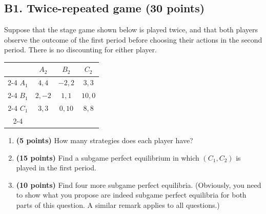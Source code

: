 \documentclass[11pt]{article}
\newcommand{\pts}[1]{\textbf{(#1 points)}}
\begin{document}
\subsection*{B1. Twice-repeated game \pts{30}}
Suppose that the stage game shown below is played twice, and that both players observe the outcome of the first period before choosing their actions in the second period. There is no discounting for either player.
\begin{center}
\begin{tabular}{c|c|c|c|}
  \multicolumn{1}{c}{} & \multicolumn{1}{c}{$A_2$} & \multicolumn{1}{c}{$B_2$} & \multicolumn{1}{c}{$C_2$} \\ \cline{2-4}
  $A_1$ & $4,4$  & $-2,2$ & $3,3$  \\ \cline{2-4}
  $B_1$ & $2,-2$ & $1,1$  & $10,0$ \\ \cline{2-4}
  $C_1$ & $3,3$  & $0,10$ & $8,8$  \\ \cline{2-4}
\end{tabular}
\end{center}
\begin{enumerate}
  \item[(a)] \pts{5} How many strategies does each player have?
  \item[(b)] \pts{15} Find a subgame perfect equilibrium in which $(C_1,C_2)$ is played in the first period.
  \item[(c)] \pts{10} Find four more subgame perfect equilibria. (Obviously, you need to show what you propose are indeed subgame perfect equilibria for both parts of this question. A similar remark applies to all questions.)
\end{enumerate}
\end{document}
